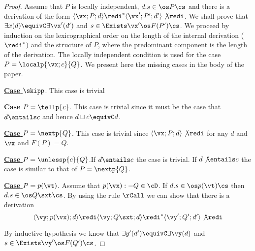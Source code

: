 \documentclass{tlp}
\begin{document}
\begin{proof} 
Assume that   $P$ is locally independent, $d.s \in \os P \cs$ and there is a derivation of the form  $\langle \vx;P;d\rangle \redi^*\langle \vx';P';d'\rangle \not\redi$. We shall prove that $\exists x(d) \equivC \exists \vx'(d')$ and
$s\in \Exists \vx' \os  F(P')\cs$. 
	We proceed by induction on the lexicographical order on the length of the internal derivation  ($\redi^*$)  and the structure of  $P$, where the predominant component is the length of the derivation. 
 The locally independent condition is used for the case $P=\localp{\vx;c}{Q}$.
 We present here the missing cases in the body of the paper. 

\noindent \underline{{\bf Case}  $\skipp$}. This case is trivial

\noindent \underline{{\bf Case}  $P = \tellp{c}$}. This case is trivial since it must be the case that $d\entails c$ and hence $d\sqcup c\equivC d$. 

\noindent \underline{{\bf Case}  $P=\nextp{Q}$}. This case is trivial since $\langle \vx;P;d \rangle \not\redi$ for any $d$ and $\vx$ and $F(P)=Q$. 


\noindent \underline{{\bf Case}  $P=\unlessp{c}{Q}$}.If  $d \entails c$ the case is trivial. If  $d\not\entails c$  the case is similar to that of $P=\nextp{Q}$. 




\noindent \underline{{\bf Case}  $P=p(\vt)$}.  Assume that 
$p(\vx) :- Q \in  \cD$.   If $d.s \in \os p(\vt)\cs$ then   $d.s\in \os  Q\sxt \cs $. By using the rule $\rCall$ we can show that there is a derivation
\[
\langle \vy; p(\vx);d\rangle \redi \langle \vy; Q\sxt ;d\rangle \redi^* \langle \vy'; Q';d'\rangle \not\redi
\]

By inductive hypothesis we know that $\exists y'(d')\equivC \exists \vy(d)$ and 
$s\in \Exists \vy' \os F( Q') \cs$. 

\end{proof}
\end{document}
